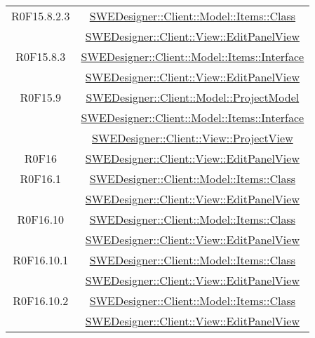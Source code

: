 \documentclass[../DefinizioneDiProdotto.tex]{subfiles}
\begin{document}
\begin{longtable}{|c|c|}
				R0F15.8.2.3
				& \hyperlink{SWEDesigner::Client::Model::Items::Class}{SWEDesigner::Client::Model::Items::Class}\\
				& \hyperlink{SWEDesigner::Client::View::EditPanelView}{SWEDesigner::Client::View::EditPanelView}\\
				\hline

				R0F15.8.3
				& \hyperlink{SWEDesigner::Client::Model::Items::Interface}{SWEDesigner::Client::Model::Items::Interface}\\
				& \hyperlink{SWEDesigner::Client::View::EditPanelView}{SWEDesigner::Client::View::EditPanelView}\\
				\hline

				R0F15.9
				& \hyperlink{SWEDesigner::Client::Model::ProjectModel}{SWEDesigner::Client::Model::ProjectModel}\\
				& \hyperlink{SWEDesigner::Client::Model::Items::Interface}{SWEDesigner::Client::Model::Items::Interface}\\
				& \hyperlink{SWEDesigner::Client::View::ProjectView}{SWEDesigner::Client::View::ProjectView}\\
				\hline

				R0F16
				& \hyperlink{SWEDesigner::Client::View::EditPanelView}{SWEDesigner::Client::View::EditPanelView}\\
				\hline

				R0F16.1
				& \hyperlink{SWEDesigner::Client::Model::Items::Class}{SWEDesigner::Client::Model::Items::Class}\\
				& \hyperlink{SWEDesigner::Client::View::EditPanelView}{SWEDesigner::Client::View::EditPanelView}\\
				\hline

				R0F16.10
				& \hyperlink{SWEDesigner::Client::Model::Items::Class}{SWEDesigner::Client::Model::Items::Class}\\
				& \hyperlink{SWEDesigner::Client::View::EditPanelView}{SWEDesigner::Client::View::EditPanelView}\\
				\hline

				R0F16.10.1
				& \hyperlink{SWEDesigner::Client::Model::Items::Class}{SWEDesigner::Client::Model::Items::Class}\\
				& \hyperlink{SWEDesigner::Client::View::EditPanelView}{SWEDesigner::Client::View::EditPanelView}\\
				\hline

				R0F16.10.2
				& \hyperlink{SWEDesigner::Client::Model::Items::Class}{SWEDesigner::Client::Model::Items::Class}\\
				& \hyperlink{SWEDesigner::Client::View::EditPanelView}{SWEDesigner::Client::View::EditPanelView}\\
				\hline


\end{longtable}
\end{document}

